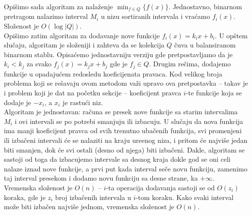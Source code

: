 \documentclass[a4paper,12pt]{article}
\numberwithin{equation}{subsection}
\begin{document}
Opi\v simo sada algoritam za nala\v zenje $\min_{f \in Q} \{ f(x) \}$. Jednostavno, binarnom pretragom nalazimo interval $M_i$ u nizu sortiranih intervala i vra\' camo $f_i(x)$. Slo\v zenost je $O(\log |Q|)$.
\\

Opi\v simo zatim algoritam za dodavanje nove funkcije $f_i(x) = k_i x + b_i$. U op\v stem slu\v caju, algoritam je slo\v zeniji i zahteva da se kolekcija $Q$ \v cuva u balansiranom binarnom stablu. Opisa\' cemo jednostavniju verziju gde pretpostavljamo da je $k_i < k_j$ za svako $f_j(x) = k_j x + b_j$ gde je $f_j \in Q$. Drugim re\v cima, dodajemo funkcije u opadaju\' cem redosledu koeficijenata pravaca. Kod velikog broja problema koji se re\v savaju ovom metodom va\v zi upravo ova pretpostavka -- takav je i problem koji je dat na po\v cetku sekcije -- koeficijent pravca $i$-te funkcije koja se dodaje je $-x_i$, a $x_i$ je rastu\' ci niz.
\\

Algoritam je jednostavan: ra\v cuna se presek nove funkcije sa starim intervalima $M_i$ i ovi intervali se po potrebi smanjuju ili izbacuju. U slu\v caju da nova funkcija ima manji koeficijent pravca od svih trenutno uba\v cenih funkcija, svi promenjeni ili izba\v ceni intervali \' ce se nalaziti na kraju ure\dj enog niza, i pritom \' ce najvi\v se jedan biti smanjen, dok \' ce svi ostali (desno od njega) biti izba\v ceni. Dakle, algoritam se sastoji od toga da izbacujemo intervale sa desnog kraja dokle god se oni celi nalaze iznad nove funkcije, a prvi put kada interval se\v ce novu funkciju, zamenimo taj interval presekom i dodamo novu funkciju sa desne strane, ka $+\infty$. Vremenska slo\v zenost je $O(n)$ -- $i$-ta operacija dodavanja sastoji se od $O(z_i)$ koraka, gde je $z_i$ broj izba\v cenih intervala u $i$-tom koraku. Kako svaki interval mo\v ze biti izba\v cen najvi\v se jednom, vremenska slo\v zenost je $O(n)$.
\end{document}
